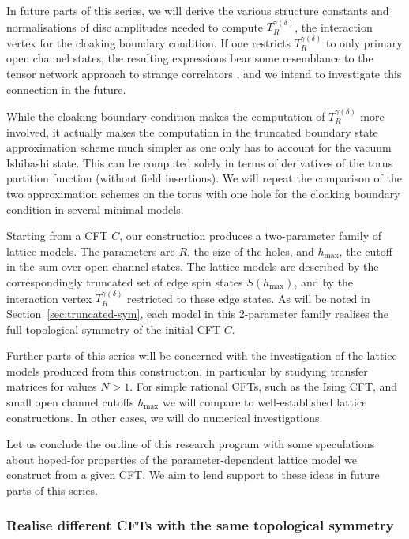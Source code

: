 \documentclass[11pt,a4paper]{article}
\numberwithin{equation}{section}
\begin{document}
In future parts of this series, we will derive the various structure constants and normalisations of disc amplitudes needed to compute $T^{\gamma(\delta)}_R$, the interaction vertex for the cloaking boundary condition. If one restricts $T^{\gamma(\delta)}_R$ to only primary open channel states, the resulting expressions bear some resemblance to the tensor network approach to strange correlators \cite{you2014wave,Vanhove:2018wlb}, and we intend to investigate this connection in the future.

While the cloaking boundary condition makes the computation of $T^{\gamma(\delta)}_R$ more involved, it actually makes the computation in the truncated boundary state approximation scheme much simpler as one only has to account for the vacuum Ishibashi state. This can be computed solely in terms of derivatives of the torus partition function (without field insertions). We will repeat the comparison of the two approximation schemes on the torus with one hole for the cloaking boundary condition in several minimal models.

Starting from a CFT $C$, our construction produces a two-parameter family of lattice models. The parameters are $R$, the size of the holes, and $h_\mathrm{max}$, the cutoff in the sum over open channel states. The lattice models are described by the correspondingly truncated set of edge spin states $S(h_\mathrm{max})$, and by the interaction vertex $T^{\gamma(\delta)}_R$ restricted to these edge states. As will be noted in Section~\ref{sec:truncated-sym}, each model in this 2-parameter family realises the full topological symmetry of the initial CFT $C$.

Further parts of this series will be concerned with the investigation of the lattice models produced from this construction, in particular by studying transfer matrices for values $N>1$. 
For simple rational CFTs, such as the Ising CFT, and small open channel cutoffs $h_\mathrm{max}$ we will compare to well-established lattice constructions. In other cases, we will do numerical investigations. 

\medskip

Let us conclude the outline of this research program with some speculations about hoped-for properties of the parameter-dependent lattice model
we construct from a given CFT. We aim to lend support to these ideas in future parts of this series.

\subsubsection*{Realise different CFTs with the same topological symmetry}
\end{document}
